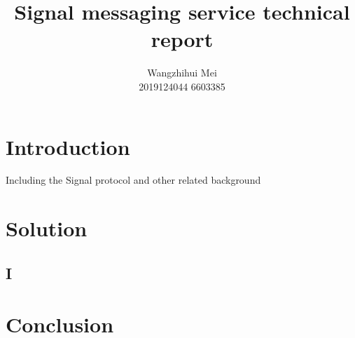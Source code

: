 \documentclass[11pt,en]{elegantpaper}
\title{Signal messaging service technical report}
\author{Wangzhihui Mei \\ 2019124044 6603385}
\institute{CCNU-UOW JI}
\date{}
\begin{document}
\maketitle

\begin{abstract}
	
\end{abstract}

\section{Introduction}
Including the Signal protocol and other related background


\section{Solution}
\subsection{I}

\section{Conclusion}


\end{document}
